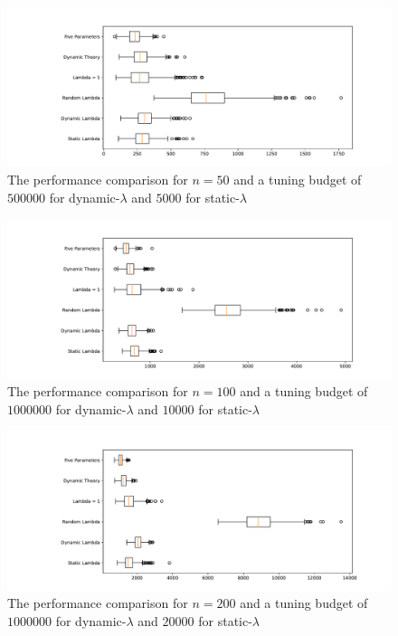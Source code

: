 \documentclass{article}
\begin{document}
\begin{figure}[ht]
    \centering
        \includegraphics[width=1.0\textwidth]{box_plot_50_100_10000.pdf}
        \caption{The performance comparison for $n = 50$ and a tuning budget of $500000$ for dynamic-$\lambda$ and $5000$ for static-$\lambda$}
        \label{box_plot_50_100_10000}
\end{figure}

\begin{figure}[ht]
    \centering
        \includegraphics[width=1.0\textwidth]{box_plot_100_100_10000.pdf}
        \caption{The performance comparison for $n = 100$ and a tuning budget of $1000000$ for dynamic-$\lambda$ and $10000$ for static-$\lambda$}
        \label{box_plot_100_100_10000}
\end{figure}

\begin{figure}[ht]
    \centering
        \includegraphics[width=1.0\textwidth]{box_plot_200_100_5000.pdf}
        \caption{The performance comparison for $n = 200$ and a tuning budget of $1000000$ for dynamic-$\lambda$ and $20000$ for static-$\lambda$}
        \label{box_plot_200_100_5000}
\end{figure}
\end{document}
